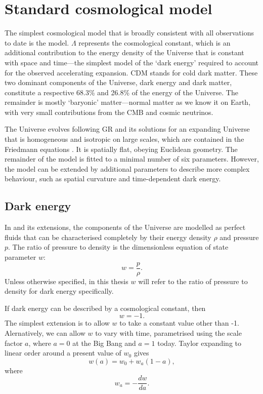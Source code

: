 \documentclass{scrbook}
\begin{document}
\section{Standard cosmological model}
\label{Sec:std_model}

The simplest cosmological model that is broadly consistent with all observations to date is the \lcdm{} model. $\Lambda$ represents the cosmological constant, which is an additional contribution to the energy density of the Universe that is constant with space and time---the simplest model of the `dark energy' required to account for the observed accelerating expansion. CDM stands for cold dark matter. These two dominant components of the Universe, dark energy and dark matter, constitute a respective 68.3\% and 26.8\% of the energy of the Universe. The remainder is mostly `baryonic' matter---normal matter as we know it on Earth, with very small contributions from the CMB and cosmic neutrinos.

The \lcdm{} Universe evolves following GR and its solutions for an expanding Universe that is homogeneous and isotropic on large scales, which are contained in the Friedmann equations \citep{Friedmann1922,Friedmann1924}. It is spatially flat, obeying Euclidean geometry. The remainder of the model is fitted to a minimal number of six parameters. However, the model can be extended by additional parameters to describe more complex behaviour, such as spatial curvature and time-dependent dark energy.

\subsection{Dark energy}

In \lcdm{} and its extensions, the components of the Universe are modelled as perfect fluids that can be characterised completely by their energy density $\rho$ and pressure $p$. The ratio of pressure to density is the dimensionless equation of state parameter $w$:
\begin{equation}
w = \frac{p}{\rho}.
\end{equation}
Unless otherwise specified, in this thesis $w$ will refer to the ratio of pressure to density for dark energy specifically.

If dark energy can be described by a cosmological constant, then
\begin{equation}
w = -1.
\end{equation}
The simplest extension is to allow $w$ to take a constant value other than -1. Alernatively, we can allow $w$ to vary with time, parametrised using the scale factor $a$, where $a = 0$ at the Big Bang and $a = 1$ today. Taylor expanding to linear order around a present value of $w_0$ gives
\begin{equation}
w \left( a \right) = w_0 + w_a \left( 1 - a \right),
\end{equation}
where
\begin{equation}
w_a = - \frac{dw}{da}.
\end{equation}
\end{document}
